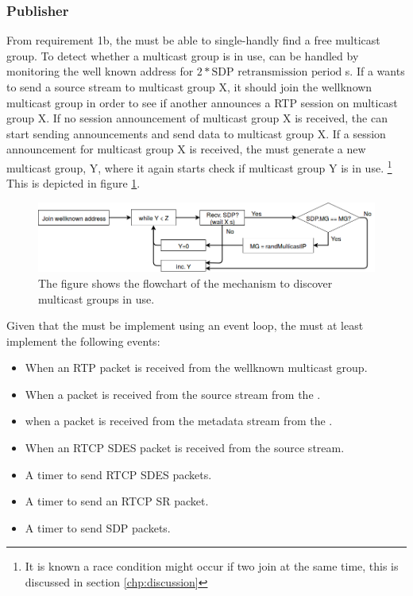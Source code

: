 \subsubsection{Publisher}
From requirement 1b, the \pub{} must be able to single-handly find a free multicast group. To detect whether a multicast group is in use, can be handled by monitoring the well known address for $2*\text{SDP retransmission period}$ s. If a  wants to send a source stream to multicast group X, it should join the wellknown multicast group in order to see if another  announces a RTP session on multicast group X. If no session announcement of multicast group X is received, the  can start sending announcements and send data to multicast group X. If a session announcement for multicast group X is received, the  must generate a new multicast group, Y, where it again starts check if multicast group Y is in use. \footnote{It is known a race condition might occur if two \pubs{} join at the same time, this is discussed in section \ref{chp:discussion}} This is depicted in figure \ref{fig:design:pubsub:inuse}.

\begin{figure}[H]
	\centering
	\includegraphics[width=\textwidth]{figures/flowchart-publisher-mg}
	\caption{The figure shows the flowchart of the mechanism to discover multicast groups in use.} \label{fig:design:pubsub:inuse}
\end{figure} 


Given that the \pub{} must be implement using an event loop, the \pub{} must at least implement the following events:


\begin{itemize}
	\item When an RTP packet is received from the wellknown multicast group.
	\item When a packet is received from the source stream from the \con{}.
	\item when a packet is received from the metadata stream from the \pro{}.
	\item When an RTCP SDES packet is received from the source stream.
	\item A timer to send RTCP SDES packets.
	\item A timer to send an RTCP SR packet.
	\item A timer to send SDP packets.
\end{itemize}

